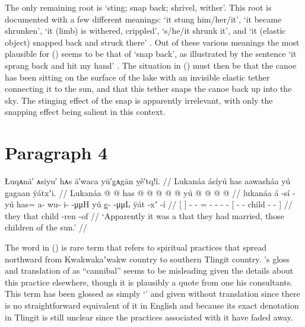 The only remaining root is  ‘sting; snap back; shrivel, wither’.
This root is documented with a few different meanings:  ‘it stung him/her/it’,  ‘it became shrunken’,  ‘it (limb) is withered, crippled’,  ‘s/he/it shrunk it’, and  ‘it (elastic object) snapped back and struck there’ \parencite[791]{leer:1976}.
Out of these various meanings the most plausible for (\lastx) seems to be that of ‘snap back’, as illustrated by the sentence  ‘it sprang back and hit my hand’ \parencite[190.2631]{story-naish:1973}.
The situation in (\lastx) must then be that the canoe has been sitting on the surface of the lake with an invisible elastic tether connecting it to the sun, and that this tether snaps the canoe back up into the sky.
The stinging effect of the snap is apparently irrelevant, with only the snapping effect being salient in this context.

\section{Paragraph 4}\label{sec:89-para-4}

\ex\label{ex:89-52-married-lukanaa}%
%
\begingl
	\glpreamble	Łuqᴀnā′ ᴀsiyu′ hᴀs ā′waca yū′g̣ᴀgān ỵê′tq!î. //
	\glpreamble	Lukanáa ásíyú has aawasháa yú g̱agaan ÿátxʼi. //
	\gla	{} Lukanáa {}
		 @ {} @ {}
		has @  @ {} @ {} @ {} @ {}
		{} yú  @ {} @ {}  @ {} @ {} {} //
	\glb	{} lukanáa {}
		á -sí -yú
		has= a- wu- i-  -μμH
		{} yú g̱-  -μμL ÿát -xʼ -í {} //
	\glc	{}[  {}]
		 - -
		= - - -  -
		{}[  -  - child - - {}] //
	\gld	{}  {}
		 {} {}
		they  {} {} {} {}
		{} that  {} {} child -ren -of {} //
	\glft	‘Apparently it was a  that they had married, those children of the sun.’
		//
\endgl
\xe

The word  in (\lastx) is rare term that refers to spiritual practices that spread northward from Kwakwakaʼwakw country to southern Tlingit country.
\citeauthor{swanton:1909}’s gloss and translation of  as “cannibal” seems to be misleading given the details about this practice elsewhere, though it is plausibly a quote from one his consultants.
This term has been glossed as simply ‘’ and given without translation since there is no straightforward equivalent of it in English and because its exact denotation in Tlingit is still unclear since the practices associated with it have faded away.

